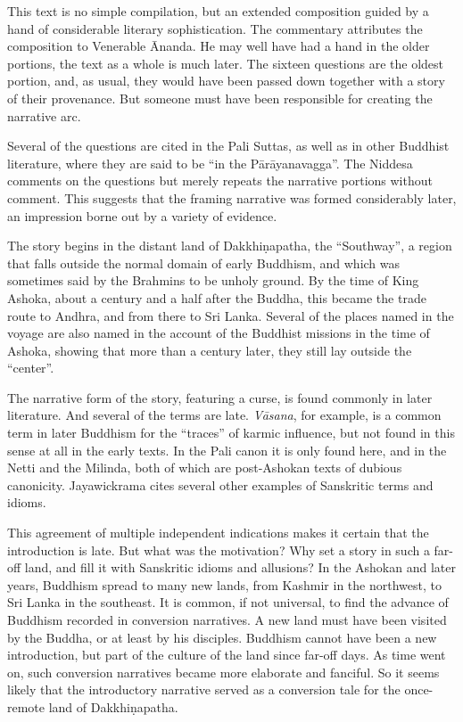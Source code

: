 \documentclass[12pt,openany]{book}%
\begin{document}
This text is no simple compilation, but an extended composition guided by a hand of considerable literary sophistication. The commentary attributes the composition to Venerable Ānanda. He may well have had a hand in the older portions, the text as a whole is much later. The sixteen questions are the oldest portion, and, as usual, they would have been passed down together with a story of their provenance. But someone must have been responsible for creating the narrative arc.

Several of the questions are cited in the Pali Suttas, as well as in other Buddhist literature, where they are said to be “in the \textsanskrit{Pārāyanavagga}”. The Niddesa comments on the questions but merely repeats the narrative portions without comment. This suggests that the framing narrative was formed considerably later, an impression borne out by a variety of evidence.

The story begins in the distant land of \textsanskrit{Dakkhiṇapatha}, the “Southway”, a region that falls outside the normal domain of early Buddhism, and which was sometimes said by the Brahmins to be unholy ground. By the time of King Ashoka, about a century and a half after the Buddha, this became the trade route to Andhra, and from there to Sri Lanka. Several of the places named in the voyage are also named in the account of the Buddhist missions in the time of Ashoka, showing that more than a century later, they still lay outside the “center”.

The narrative form of the story, featuring a curse, is found commonly in later literature. And several of the terms are late. \textit{\textsanskrit{Vāsana}}, for example, is a common term in later Buddhism for the “traces” of karmic influence, but not found in this sense at all in the early texts. In the Pali canon it is only found here, and in the Netti and the Milinda, both of which are post-Ashokan texts of dubious canonicity. Jayawickrama cites several other examples of Sanskritic terms and idioms.

This agreement of multiple independent indications makes it certain that the introduction is late. But what was the motivation? Why set a story in such a far-off land, and fill it with Sanskritic idioms and allusions? In the Ashokan and later years, Buddhism spread to many new lands, from Kashmir in the northwest, to Sri Lanka in the southeast. It is common, if not universal, to find the advance of Buddhism recorded in conversion narratives. A new land must have been visited by the Buddha, or at least by his disciples. Buddhism cannot have been a new introduction, but part of the culture of the land since far-off days. As time went on, such conversion narratives became more elaborate and fanciful. So it seems likely that the introductory narrative served as a conversion tale for the once-remote land of \textsanskrit{Dakkhiṇapatha}.
\end{document}
